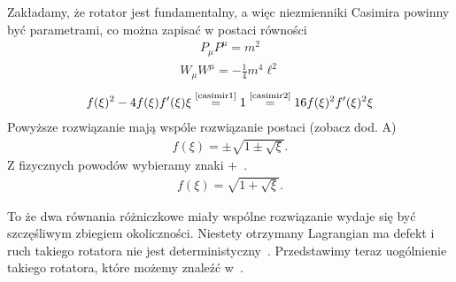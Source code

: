 Zakładamy, że rotator jest fundamentalny, a więc niezmienniki
Casimira powinny być parametrami, co można zapisać w postaci
równości
\begin{align} \label{casimir1}
P_\mu P^\mu = m^2 \tag{C1}
\end{align}
\begin{align} \label{casimir2}
W_\mu W^\mu = - \frac{1}{4} m^4 \ell^2\tag{C2}
\end{align}
\begin{align*} 
 f(\xi)^2- 4 f(\xi) f'(\xi) \xi
\stackrel{\text{\ref{casimir1}}}{=} 
1 \stackrel{\text{\ref{casimir2}}}{=}
  16   f(\xi)^2 f'(\xi)^2 \xi
\end{align*}
Powyższe rozwiązanie mają wspóle rozwiązanie 
postaci (zobacz dod. A)
\begin{align*}
f(\xi ) = \pm \sqrt{ 1 \pm \sqrt{\xi} }.
\end{align*}
Z fizycznych powodów wybieramy znaki $+$~\cite{Bratek2009nonuniq}.
\begin{align*}
f(\xi ) =  \sqrt{ 1 + \sqrt{\xi} }.
\end{align*}

To że dwa równania różniczkowe miały wspólne rozwiązanie 
wydaje się być szczęśliwym zbiegiem okoliczności. 
Niestety otrzymany Lagrangian ma defekt i ruch takiego 
rotatora nie jest deterministyczny~\cite{Bratek2012Spinorindeterm}.
Przedstawimy teraz uogólnienie takiego rotatora,
które możemy znaleźć w~\cite{Bratek2015wiele}.


